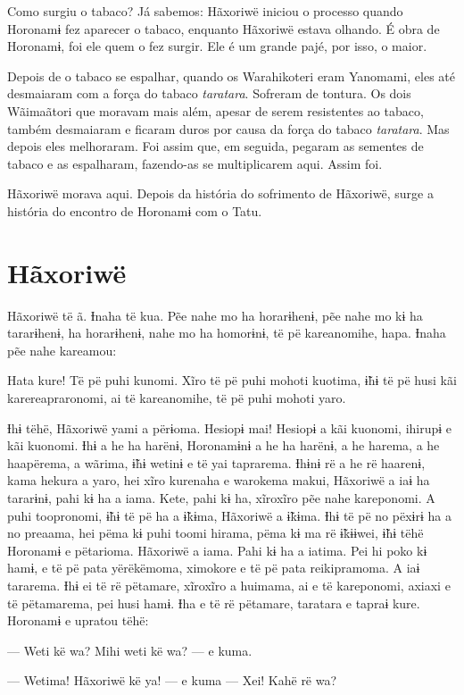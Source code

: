 Como surgiu o tabaco? Já sabemos: Hãxoriwë iniciou o processo quando
Horonamɨ fez aparecer o tabaco, enquanto Hãxoriwë estava olhando. É obra
de Horonamɨ, foi ele quem o fez surgir. Ele é um grande pajé, por isso,
o maior. 

Depois de o tabaco se espalhar, quando os Warahikoteri eram Yanomami,
eles até desmaiaram com a força do tabaco \textit{taratara}. Sofreram de
tontura. Os dois Wãimaãtori que moravam mais além, apesar de serem
resistentes ao tabaco, também desmaiaram e ficaram duros por causa da
força do tabaco \textit{taratara}. Mas depois eles melhoraram. Foi assim
que, em seguida, pegaram as sementes de tabaco e as espalharam,
fazendo-as se multiplicarem aqui. Assim foi.

Hãxoriwë morava aqui. Depois da história do sofrimento de Hãxoriwë,
surge a história do encontro de Horonamɨ com o Tatu.

\chapter{Hãxoriwë}

Hãxoriwë të ã. Ɨnaha të kua. Pẽe nahe mo ha horarɨhenɨ, pẽe nahe mo kɨ
ha tararɨhenɨ, ha horarɨhenɨ, nahe mo ha homorɨnɨ, të pë kareanomihe,
hapa. Ɨnaha pẽe nahe kareamou: 

Hata kure! Të pë puhi kunomi. Xĩro të pë puhi mohoti kuotima, ɨ̃hɨ të pë
husi kãi karereapraronomi, ai të kareanomihe, të pë puhi mohoti yaro. 

Ɨhɨ tëhë, Hãxoriwë yami a përɨoma. Hesiopɨ mai! Hesiopɨ a kãi kuonomi,
ihirupɨ e kãi kuonomi. Ɨhɨ a he ha harënɨ, Horonamɨnɨ a he ha harënɨ, a
he harema, a he haapërema, a wãrima, ɨ̃hɨ wetinɨ e të yai taprarema.
Ɨhɨnɨ rë a he rë haarenɨ, kama hekura a yaro, hei xĩro kurenaha e
warokema makui, Hãxoriwë a iaɨ ha tararɨnɨ, pahi kɨ ha a iama. Kete,
pahi kɨ ha, xĩroxĩro pẽe nahe kareponomi. A puhi toopronomi, ɨ̃hɨ të pë
ha a ɨ̃kɨma, Hãxoriwë a ɨ̃kɨma. Ɨhɨ të pë no pëxɨrɨ ha a no preaama, hei
pëma kɨ puhi toomi hirama, pëma kɨ ma rë ɨ̃kɨɨwei, ɨ̃hɨ tëhë Horonamɨ e
pëtarioma. Hãxoriwë a iama. Pahi kɨ ha a iatima. Pei hi poko kɨ hamɨ, e
të pë pata yërëkëmoma, ximokore e të pë pata reikipramoma. A iaɨ
tararema. Ɨhɨ ei të rë pëtamare, xĩroxĩro a huimama, ai e të kareponomi,
axiaxi e të pëtamarema, pei husi hamɨ. Ɨha e të rë pëtamare, taratara e
tapraɨ kure. Horonamɨ e upratou tëhë: 

--- Weti kë wa? Mihi weti kë wa? --- e kuma. 

--- Wetima! Hãxoriwë kë ya! --- e kuma --- Xei! Kahë rë wa? 

